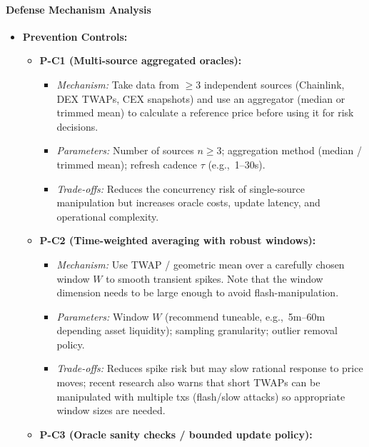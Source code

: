 \paragraph{Defense Mechanism Analysis}
\begin{itemize}
    \item \textbf{Prevention Controls:}
        \begin{itemize}
            \item \textbf{P-C1 (Multi-source aggregated oracles):}
                \begin{itemize}
                    \item \textit{Mechanism:} Take data from $\geq 3$ independent sources (Chainlink, DEX TWAPs, CEX snapshots) and use an aggregator (median or trimmed mean) to calculate a reference price before using it for risk decisions. \cite{chainlink2021defi, chainalysis2023oracle}
                    \item \textit{Parameters:} Number of sources $n \geq 3$; aggregation method (median / trimmed mean); refresh cadence $\tau$ (e.g.,\ 1--30s).
                    \item \textit{Trade-offs:} Reduces the concurrency risk of single-source manipulation but increases oracle costs, update latency, and operational complexity.
                \end{itemize}
            \item \textbf{P-C2 (Time-weighted averaging with robust windows):}
                \begin{itemize}
                    \item \textit{Mechanism:} Use TWAP / geometric mean over a carefully chosen window $W$ to smooth transient spikes. Note that the window dimension needs to be large enough to avoid flash-manipulation. \cite{chainlink2021defi}
                    \item \textit{Parameters:} Window $W$ (recommend tuneable, e.g.,\ 5m--60m depending asset liquidity); sampling granularity; outlier removal policy.
                    \item \textit{Trade-offs:} Reduces spike risk but may slow rational response to price moves; recent research also warns that short TWAPs can be manipulated with multiple txs (flash/slow attacks) so appropriate window sizes are needed. \cite{bai2024ormer}
                \end{itemize}
            \item \textbf{P-C3 (Oracle sanity checks / bounded update policy):}
                \begin{itemize}

\end{itemize}
\end{itemize}
\end{itemize}
